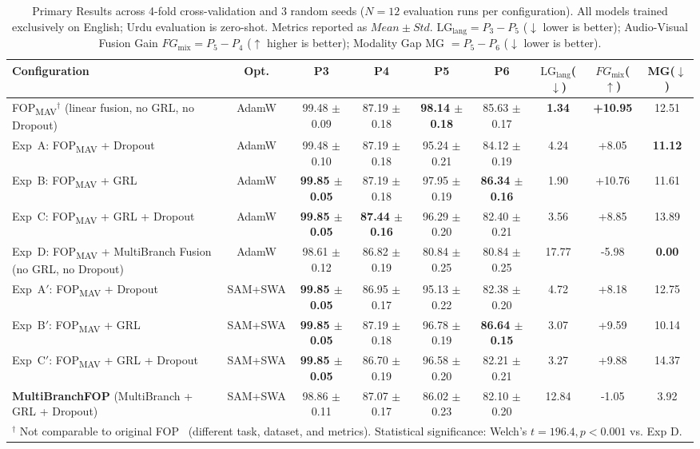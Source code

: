 \documentclass[conference]{IEEEtran}
\newcommand{\fopmav}{FOP\textsubscript{MAV}}
\begin{document}
\begin{table}[t]
\caption{Primary Results across 4-fold cross-validation and 3 random seeds ($N=12$ evaluation runs per configuration).
All models trained exclusively on English; Urdu evaluation is zero-shot.
Metrics reported as $Mean \pm Std$.
$\text{LG}_{\text{lang}} = P_3 - P_5$ ($\downarrow$ lower is better); Audio-Visual Fusion Gain $FG_{\text{mix}} = P_5 - P_4$ ($\uparrow$ higher is better); Modality Gap MG $= P_5 - P_6$ ($\downarrow$ lower is better).}
\label{tab:main_results}
\begin{center}
\begin{tabular}{lcccccccc}
\toprule
\textbf{Configuration} & \textbf{Opt.} & \textbf{P3} & \textbf{P4} & \textbf{P5}
  & \textbf{P6} & $\text{LG}_{\text{lang}}$($\downarrow$)
  & $FG_{\text{mix}}$($\uparrow$) & MG($\downarrow$) \\
\midrule
\fopmav{}$^\dagger$ (linear fusion, no GRL, no Dropout)
  & AdamW & 99.48 $\pm$ 0.09 & 87.19 $\pm$ 0.18 & \textbf{98.14 $\pm$ 0.18} & 85.63 $\pm$ 0.17 & \textbf{1.34} & \textbf{+10.95} & 12.51 \\
Exp~A: \fopmav{} + Dropout
  & AdamW & 99.48 $\pm$ 0.10 & 87.19 $\pm$ 0.18 & 95.24 $\pm$ 0.21 & 84.12 $\pm$ 0.19 & 4.24 & +8.05 & \textbf{11.12} \\
Exp~B: \fopmav{} + GRL
  & AdamW & \textbf{99.85 $\pm$ 0.05} & 87.19 $\pm$ 0.18 & 97.95 $\pm$ 0.19 & \textbf{86.34 $\pm$ 0.16} & 1.90 & +10.76 & 11.61 \\
Exp~C: \fopmav{} + GRL + Dropout
  & AdamW & \textbf{99.85 $\pm$ 0.05} & \textbf{87.44 $\pm$ 0.16} & 96.29 $\pm$ 0.20 & 82.40 $\pm$ 0.21 & 3.56 & +8.85 & 13.89 \\
\midrule
Exp~D: \fopmav{} + MultiBranch Fusion (no GRL, no Dropout)
  & AdamW & 98.61 $\pm$ 0.12 & 86.82 $\pm$ 0.19 & 80.84 $\pm$ 0.25 & 80.84 $\pm$ 0.25 & 17.77 & -5.98 & \textbf{0.00} \\
Exp~A$'$: \fopmav{} + Dropout
  & SAM+SWA & \textbf{99.85 $\pm$ 0.05} & 86.95 $\pm$ 0.17 & 95.13 $\pm$ 0.22 & 82.38 $\pm$ 0.20 & 4.72 & +8.18 & 12.75 \\
Exp~B$'$: \fopmav{} + GRL
  & SAM+SWA & \textbf{99.85 $\pm$ 0.05} & 87.19 $\pm$ 0.18 & 96.78 $\pm$ 0.19 & \textbf{86.64 $\pm$ 0.15} & 3.07 & +9.59 & 10.14 \\
Exp~C$'$: \fopmav{} + GRL + Dropout
  & SAM+SWA & \textbf{99.85 $\pm$ 0.05} & 86.70 $\pm$ 0.19 & 96.58 $\pm$ 0.20 & 82.21 $\pm$ 0.21 & 3.27 & +9.88 & 14.37 \\
\midrule
\textbf{MultiBranchFOP} (MultiBranch + GRL + Dropout)
  & SAM+SWA & 98.86 $\pm$ 0.11 & 87.07 $\pm$ 0.17 & 86.02 $\pm$ 0.23 & 82.10 $\pm$ 0.20 & 12.84 & -1.05 & 3.92 \\
\bottomrule
\multicolumn{9}{l}{$^\dagger$ Not comparable to original FOP~\cite{fop_original}
  (different task, dataset, and metrics). Statistical significance: Welch's $t = 196.4, p < 0.001$ vs. Exp D.}
\end{tabular}
\end{center}
\end{table}
\end{document}
